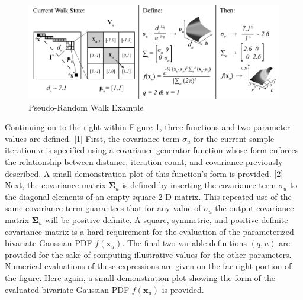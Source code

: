             \begin{figure}[!h]
            \centering
            \includegraphics[width=5.5in]{figures/pseudo-random-walk-example.png}
            \caption[Pseudo-Random Walk Example]{Pseudo-Random Walk Example}
            \label{fig:pseudo-random-walk-example}
            \end{figure}
            
Continuing on to the right within Figure \ref{fig:pseudo-random-walk-example}, three functions and two parameter values are defined. [1] First, the covariance term $\sigma_u$ for the current sample iteration $u$ is specified using a covariance generator function whose form enforces the relationship between distance, iteration count, and covariance previously described. A small demonstration plot of this function's form is provided. [2] Next, the covariance matrix $\boldsymbol\Sigma_u$ is defined by inserting the covariance term $\sigma_u$ to the diagonal elements of an empty square 2-D matrix. This repeated use of the same covariance term guarantees that for any value of $\sigma_u$ the output covariance matrix $\boldsymbol\Sigma_u$ will be positive definite. A square, symmetric, and positive definite covariance matrix is a hard requirement for the evaluation of the parameterized bivariate Gaussian PDF $f(\textbf{x}_u)$. The final two variable definitions $(q,u)$ are provided for the sake of computing illustrative values for the other parameters. Numerical evaluations of these expressions are given on the far right portion of the figure. Here again, a small demonstration plot showing the form of the evaluated bivariate Gaussian PDF $f(\textbf{x}_u)$ is provided.

